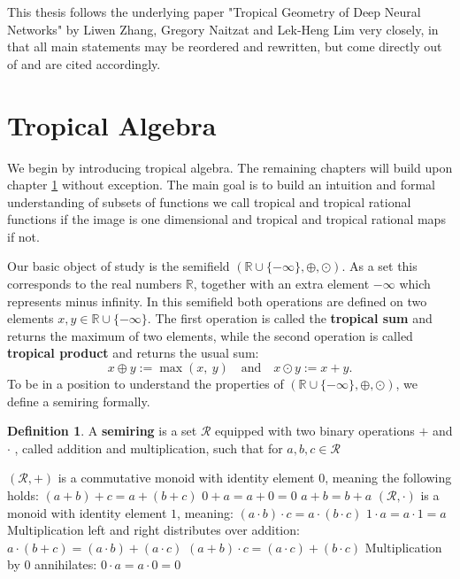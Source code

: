 \documentclass{article}
\theoremstyle{definition}
\newtheorem{definition}[theorem]{Definition}
\begin{document}
This thesis follows the underlying paper "Tropical Geometry of Deep Neural Networks" by Liwen Zhang, Gregory Naitzat and Lek-Heng Lim very closely, in that all main statements may be reordered and rewritten, but come directly out of \cite{maclagan2015introduction} and are cited accordingly.

\newpage

\section{Tropical Algebra}
\label{sec:trop_algebra}
We begin by introducing tropical algebra. The remaining chapters will build upon chapter \ref{sec:trop_algebra} without exception. The main goal is to build an intuition and formal understanding of subsets of functions we call tropical and tropical rational functions if the image is one dimensional and tropical and tropical rational maps if not.

Our basic object of study is the semifield $( \mathbb{R} \cup \{- \infty \} , \oplus , \odot )$. As a set this corresponds to the real numbers $ \mathbb{R} $, together with an extra element $- \infty $ which represents minus infinity. In this semifield both operations are defined on two elements $x, y \in \mathbb{R} \cup \{- \infty \}$. The first operation is called the \textbf{tropical sum} and returns the maximum of two elements, while the second operation is called \textbf{tropical product} and returns the usual sum:
$$ x \oplus y := \max(x,\ y) \quad \text{and} \quad x \odot y := x+y.$$
To be in a position to understand the properties of $( \mathbb{R} \cup \{- \infty \} , \oplus , \odot )$, we define a semiring formally.
\begin{definition}
A \textbf{semiring} is a set $\mathcal{R}$ equipped with two binary operations $+$ and $\cdot$ , called addition and multiplication, such that for $a, b, c \in \mathcal{R}$ \cite{berstel1985theory} \\
\begin{outline}
  \1 $(\mathcal{R}, +)$ is a commutative monoid with identity element 0, meaning the following holds:
    \2 $(a + b) + c = a + (b + c)$
    \2 $0 + a = a + 0 = 0$
    \2 $a + b = b + a$
  \1 $(\mathcal{R}, \cdot)$ is a monoid with identity element $1$, meaning:
    \2 $(a \cdot b) \cdot c = a \cdot (b \cdot c)$
    \2 $ 1 \cdot a = a \cdot 1 = a $
  \1 Multiplication left and right distributes over addition:
    \2 $ a \cdot (b + c) = (a \cdot b) + (a \cdot c)$
    \2 $ (a + b) \cdot c = (a \cdot c) + (b \cdot c)$
  \1 Multiplication by 0 annihilates:
    \2 $ 0 \cdot a = a \cdot 0 = 0$
\end{outline}
\end{definition}
\end{document}
